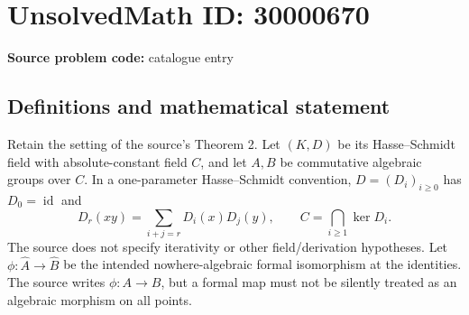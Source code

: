 \documentclass[11pt]{article}
\begin{document}
\section*{UnsolvedMath ID: 30000670}
\textbf{Source problem code:} catalogue entry
\subsection{Definitions and mathematical statement}
Retain the setting of the source's Theorem 2. Let \((K,D)\) be its Hasse--Schmidt field with absolute-constant field \(C\), and let \(A,B\) be commutative algebraic groups over \(C\). In a one-parameter Hasse--Schmidt convention, \(D=(D_i)_{i\geq0}\) has \(D_0=\operatorname{id}\) and
\[
 D_r(xy)=\sum_{i+j=r}D_i(x)D_j(y),\qquad
 C=\bigcap_{i\geq1}\ker D_i.
\]
The source does not specify iterativity or other field/derivation hypotheses. Let \(\phi:\widehat A\to\widehat B\) be the intended nowhere-algebraic formal isomorphism at the identities. The source writes \(\phi:A\to B\), but a formal map must not be silently treated as an algebraic morphism on all points.
\end{document}

